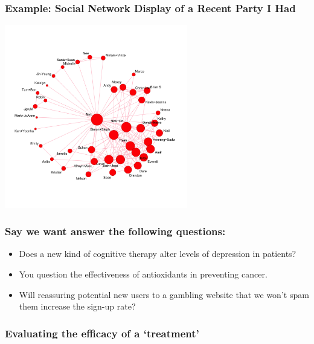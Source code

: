 \documentclass[slides]{beamer}
\newcommand{\blue}[1]{\textcolor{blue2}{#1}}
\begin{document}
\begin{frame}[fragile]
\frametitle{Example: Social Network Display of a Recent Party I Had}
\begin{center}
\includegraphics[width=8cm]{figure/network.png}
\end{center}
\end{frame}


\begin{frame}
\frametitle{Say we want answer the following questions:}
\begin{itemize}
\item Does a new kind of cognitive therapy alter levels of depression in patients?
\pause\item You question the effectiveness of antioxidants in preventing cancer.
\pause\item Will reassuring potential new users to a gambling website that we won't spam them increase the sign-up rate?
\end{itemize}

\end{frame}



\begin{frame}
\frametitle{Evaluating the efficacy of a `treatment'}

%
%

\end{frame}
\end{document}
